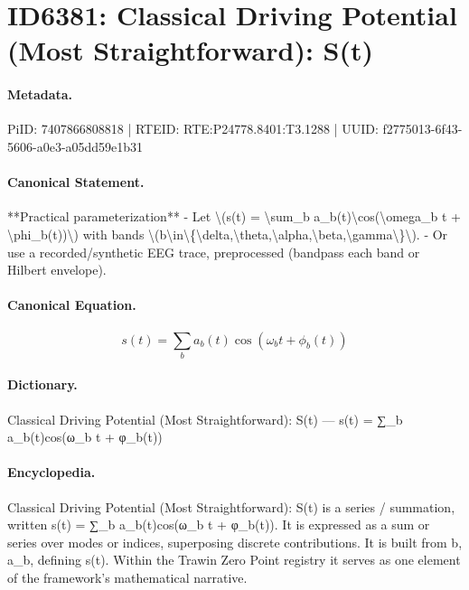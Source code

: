 \section*{ID6381: Classical Driving Potential (Most Straightforward): S(t)}
\paragraph{Metadata.}
PiID: 7407866808818 | RTEID: RTE:P24778.8401:T3.1288 | UUID: f2775013-6f43-5606-a0e3-a05dd59e1b31

\paragraph{Canonical Statement.}
**Practical parameterization** - Let \textbackslash{}(s(t) = \textbackslash{}sum\_b a\_b(t)\textbackslash{}cos(\textbackslash{}omega\_b t + \textbackslash{}phi\_b(t))\textbackslash{}) with bands \textbackslash{}(b\textbackslash{}in\textbackslash{}\{\textbackslash{}delta,\textbackslash{}theta,\textbackslash{}alpha,\textbackslash{}beta,\textbackslash{}gamma\textbackslash{}\}\textbackslash{}). - Or use a recorded/synthetic EEG trace, preprocessed (bandpass each band or Hilbert envelope).

\paragraph{Canonical Equation.}
\[
s(t) = \sum_b a_b(t)\cos(\omega_b t + \phi_b(t))
\]

\paragraph{Dictionary.}
Classical Driving Potential (Most Straightforward): S(t) — s(t) = ∑\_b a\_b(t)cos(ω\_b t + φ\_b(t))

\paragraph{Encyclopedia.}
Classical Driving Potential (Most Straightforward): S(t) is a series / summation, written s(t) = ∑\_b a\_b(t)cos(ω\_b t + φ\_b(t)). It is expressed as a sum or series over modes or indices, superposing discrete contributions. It is built from b, a\_b, defining s(t). Within the Trawin Zero Point registry it serves as one element of the framework's mathematical narrative.
